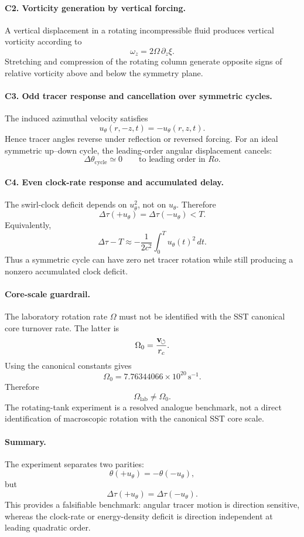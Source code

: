 \paragraph{C2. Vorticity generation by vertical forcing.}
A vertical displacement in a rotating incompressible fluid produces vertical
vorticity according to
\[
\boxed{
\omega_z=2\Omega\,\partial_z\xi.
}
\]
Stretching and compression of the rotating column generate opposite signs of
relative vorticity above and below the symmetry plane.

\paragraph{C3. Odd tracer response and cancellation over symmetric cycles.}
The induced azimuthal velocity satisfies
\[u_\theta(r,-z,t)=-u_\theta(r,z,t).
\]
Hence tracer angles reverse under reflection or reversed forcing.  For an ideal
symmetric up--down cycle, the leading-order angular displacement cancels:
\[
\boxed{
\Delta\theta_{\mathrm{cycle}}\simeq0
\qquad
\text{to leading order in }Ro.
}
\]

\paragraph{C4. Even clock-rate response and accumulated delay.}
The swirl-clock deficit depends on \(u_\theta^2\), not on \(u_\theta\).  Therefore
\[
\boxed{
\Delta\tau(+u_\theta)=\Delta\tau(-u_\theta)<T.
}
\]
Equivalently,
\[
\boxed{
\Delta\tau-T
\approx
-\frac{1}{2c^2}\int_0^Tu_\theta(t)^2\,dt.
}
\]
Thus a symmetric cycle can have zero net tracer rotation while still producing a
nonzero accumulated clock deficit.

\paragraph{Core-scale guardrail.}
The laboratory rotation rate \(\Omega\) must not be identified with the SST
canonical core turnover rate.  The latter is
\[
\Omega_0=\frac{\mathbf{v}_{\!\boldsymbol{\circlearrowleft}}}{r_c}.
\]
Using the canonical constants gives
\[
\boxed{
\Omega_0=7.76344066\times10^{20}\,\mathrm{s^{-1}}.
}
\]
Therefore
\[
\boxed{
\Omega_{\mathrm{lab}}\neq\Omega_0.
}
\]
The rotating-tank experiment is a resolved analogue benchmark, not a direct
identification of macroscopic rotation with the canonical SST core scale.

\paragraph{Summary.}
The experiment separates two parities:
\[
\boxed{
\theta(+u_\theta)=-\theta(-u_\theta),
}
\]
but
\[
\boxed{
\Delta\tau(+u_\theta)=\Delta\tau(-u_\theta).
}
\]
This provides a falsifiable benchmark: angular tracer motion is direction
sensitive, whereas the clock-rate or energy-density deficit is direction
independent at leading quadratic order.

